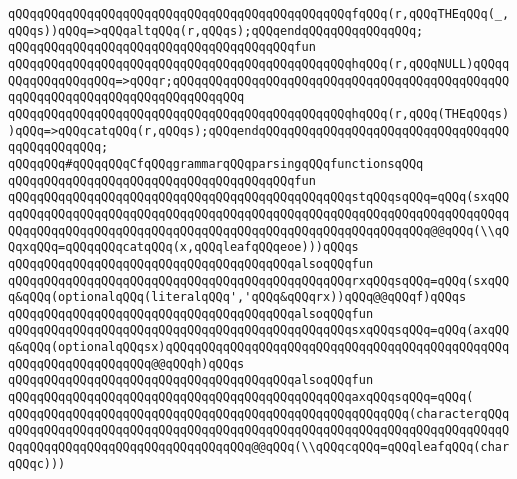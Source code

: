 \verb|qQQqqQQqqQQqqQQqqQQqqQQqqQQqqQQqqQQqqQQqqQQqqQQqfqQQq(r,qQQqTHEqQQq(_,qQQqs))qQQq=>qQQqaltqQQq(r,qQQqs);qQQqendqQQqqQQqqQQqqQQq;|\newline
\newline
\verb|qQQqqQQqqQQqqQQqqQQqqQQqqQQqqQQqqQQqqQQqfun|\newline
\verb|qQQqqQQqqQQqqQQqqQQqqQQqqQQqqQQqqQQqqQQqqQQqqQQqhqQQq(r,qQQqNULL)qQQqqQQqqQQqqQQqqQQq=>qQQqr;qQQqqQQqqQQqqQQqqQQqqQQqqQQqqQQqqQQqqQQqqQQqqQQqqQQqqQQqqQQqqQQqqQQqqQQqqQQqqQQq|\newline
\verb|qQQqqQQqqQQqqQQqqQQqqQQqqQQqqQQqqQQqqQQqqQQqqQQqhqQQq(r,qQQq(THEqQQqs))qQQq=>qQQqcatqQQq(r,qQQqs);qQQqendqQQqqQQqqQQqqQQqqQQqqQQqqQQqqQQqqQQqqQQqqQQqqQQq;|\newline
\newline
\newline
\verb|qQQqqQQq#qQQqqQQqCfqQQqgrammarqQQqparsingqQQqfunctionsqQQq|\newline
\newline
\verb|qQQqqQQqqQQqqQQqqQQqqQQqqQQqqQQqqQQqqQQqfun|\newline
\verb|qQQqqQQqqQQqqQQqqQQqqQQqqQQqqQQqqQQqqQQqqQQqqQQqstqQQqsqQQq=qQQq(sxqQQqqQQqqQQqqQQqqQQqqQQqqQQqqQQqqQQqqQQqqQQqqQQqqQQqqQQqqQQqqQQqqQQqqQQqqQQqqQQqqQQqqQQqqQQqqQQqqQQqqQQqqQQqqQQqqQQqqQQqqQQqqQQqqQQq@@qQQq(\\qQQqxqQQq=qQQqqQQqcatqQQq(x,qQQqleafqQQqeoe)))qQQqs|\newline
\verb|qQQqqQQqqQQqqQQqqQQqqQQqqQQqqQQqqQQqqQQqalsoqQQqfun|\newline
\verb|qQQqqQQqqQQqqQQqqQQqqQQqqQQqqQQqqQQqqQQqqQQqqQQqrxqQQqsqQQq=qQQq(sxqQQq&qQQq(optionalqQQq(literalqQQq','qQQq&qQQqrx))qQQq@@qQQqf)qQQqs|\newline
\verb|qQQqqQQqqQQqqQQqqQQqqQQqqQQqqQQqqQQqqQQqalsoqQQqfun|\newline
\verb|qQQqqQQqqQQqqQQqqQQqqQQqqQQqqQQqqQQqqQQqqQQqqQQqsxqQQqsqQQq=qQQq(axqQQq&qQQq(optionalqQQqsx)qQQqqQQqqQQqqQQqqQQqqQQqqQQqqQQqqQQqqQQqqQQqqQQqqQQqqQQqqQQqqQQqqQQq@@qQQqh)qQQqs|\newline
\verb|qQQqqQQqqQQqqQQqqQQqqQQqqQQqqQQqqQQqqQQqalsoqQQqfun|\newline
\verb|qQQqqQQqqQQqqQQqqQQqqQQqqQQqqQQqqQQqqQQqqQQqqQQqaxqQQqsqQQq=qQQq(|\newline
\verb|qQQqqQQqqQQqqQQqqQQqqQQqqQQqqQQqqQQqqQQqqQQqqQQqqQQqqQQq(characterqQQqqQQqqQQqqQQqqQQqqQQqqQQqqQQqqQQqqQQqqQQqqQQqqQQqqQQqqQQqqQQqqQQqqQQqqQQqqQQqqQQqqQQqqQQqqQQqqQQqqQQqqQQq@@qQQq(\\qQQqcqQQq=qQQqleafqQQq(charqQQqc)))|\newline
